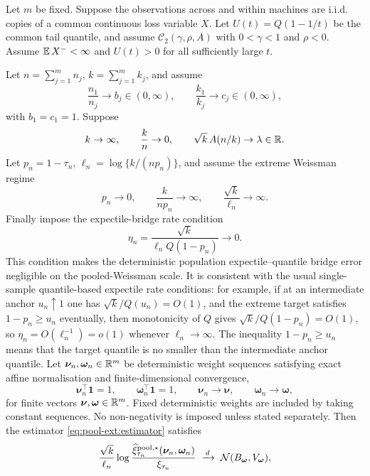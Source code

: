 \begin{conjecture}
\label{conj:pool-ext:deterministic}
Let \(m\) be fixed. Suppose the observations across and within machines are
i.i.d. copies of a common continuous loss variable \(X\). Let
\(U(t)=Q(1-1/t)\) be the common tail quantile, and assume
\(\mathcal C_2(\gamma,\rho,A)\) with \(0<\gamma<1\) and \(\rho<0\). Assume
\(\operatorname{\mathbb{E}} X^{-}<\infty\) and \(U(t)>0\) for all sufficiently large \(t\).

Let \(n=\sum_{j=1}^{m}n_j\), \(k=\sum_{j=1}^{m}k_j\), and assume
\[
  \frac{n_1}{n_j}\to b_j\in(0,\infty),
  \qquad
  \frac{k_1}{k_j}\to c_j\in(0,\infty),
\]
with \(b_1=c_1=1\). Suppose
\[
  k\to\infty,
  \qquad
  \frac{k}{n}\to0,
  \qquad
  \sqrt{k}\,A(n/k)\to\lambda\in\mathbb{R}.
\]
Let \(p_n=1-\tau_n\), \(\ell_n=\log\{k/(np_n)\}\), and assume the extreme
Weissman regime
\[
  p_n\to0,
  \qquad
  \frac{k}{np_n}\to\infty,
  \qquad
  \frac{\sqrt{k}}{\ell_n}\to\infty.
\]
Finally impose the expectile-bridge rate condition
\begin{equation}
\label{eq:pool-ext:eta}
  \eta_n
  =
  \frac{\sqrt{k}}{\ell_n Q(1-p_n)}
  \to0.
\end{equation}
This condition makes the deterministic population expectile--quantile bridge
error negligible on the pooled-Weissman scale. It is consistent with the
usual single-sample quantile-based expectile rate conditions: for example, if
at an intermediate anchor \(u_n\uparrow1\) one has
\(\sqrt{k}/Q(u_n)=O(1)\), and the extreme target satisfies
\(1-p_n\ge u_n\) eventually, then monotonicity of \(Q\) gives
\(\sqrt{k}/Q(1-p_n)=O(1)\), so \(\eta_n=O(\ell_n^{-1})=o(1)\) whenever
\(\ell_n\to\infty\). The inequality \(1-p_n\ge u_n\) means that the target
quantile is no smaller than the intermediate anchor quantile.
Let \(\bm\nu_n,\bm\omega_n\in\mathbb{R}^m\) be deterministic weight sequences
satisfying exact affine normalisation and finite-dimensional convergence,
\[
  \bm\nu_n^\top\bm 1=1,
  \qquad
  \bm\omega_n^\top\bm 1=1,
  \qquad
  \bm\nu_n\to\bm\nu,
  \qquad
  \bm\omega_n\to\bm\omega,
\]
for finite vectors \(\bm\nu,\bm\omega\in\mathbb{R}^m\). Fixed deterministic weights
are included by taking constant sequences. No non-negativity is imposed unless
stated separately. Then the estimator
\eqref{eq:pool-ext:estimator} satisfies
\begin{equation}
\label{eq:pool-ext:log-limit}
  \frac{\sqrt{k}}{\ell_n}
  \log
  \frac{
    \widehat\xi_{\tau_n}^{\mathrm{pool},\star}(\bm\nu_n,\bm\omega_n)
  }{\expectile{\tau_n}}
  \;\todist\;
  \mathcal N(B_{\bm\omega},V_{\bm\omega}),

\end{equation}
\end{conjecture}
